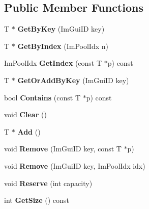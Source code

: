 \subsection*{Public Member Functions}
\begin{DoxyCompactItemize}
\item 
\mbox{\label{structImPool_ae287bf93e178ecacead30a8baea62877}} 
T $\ast$ {\bfseries Get\+By\+Key} (Im\+Gui\+ID key)
\item 
\mbox{\label{structImPool_a9f46e2f38f1a02bef31899eeb1f3fdec}} 
T $\ast$ {\bfseries Get\+By\+Index} (Im\+Pool\+Idx n)
\item 
\mbox{\label{structImPool_a3e683876ebd44c7f6f098851ee522870}} 
Im\+Pool\+Idx {\bfseries Get\+Index} (const T $\ast$p) const
\item 
\mbox{\label{structImPool_a564fd757c33978601849a6091dcd99a0}} 
T $\ast$ {\bfseries Get\+Or\+Add\+By\+Key} (Im\+Gui\+ID key)
\item 
\mbox{\label{structImPool_a2434a4efa2eab4aeca8e15ac208c18d8}} 
bool {\bfseries Contains} (const T $\ast$p) const
\item 
\mbox{\label{structImPool_a613b0fa43ad7457ebde2988d4ea5f0be}} 
void {\bfseries Clear} ()
\item 
\mbox{\label{structImPool_a10328df7e17eb5ab4b91c25ad3b0db4f}} 
T $\ast$ {\bfseries Add} ()
\item 
\mbox{\label{structImPool_a7b2c095ea540dc8afb670e705a37a912}} 
void {\bfseries Remove} (Im\+Gui\+ID key, const T $\ast$p)
\item 
\mbox{\label{structImPool_a967f556412946a33bca3950f9be7a6ae}} 
void {\bfseries Remove} (Im\+Gui\+ID key, Im\+Pool\+Idx idx)
\item 
\mbox{\label{structImPool_a62a34bcb3efcaaa3f4402c0c3cc1d600}} 
void {\bfseries Reserve} (int capacity)
\item 
\mbox{\label{structImPool_a1464c8a8182110a766c5142a1c4abbf9}} 
int {\bfseries Get\+Size} () const
\end{DoxyCompactItemize}
